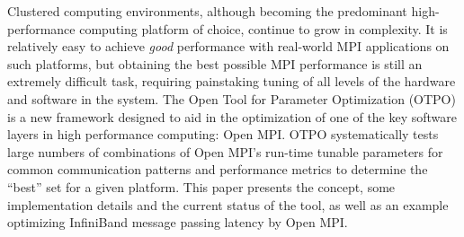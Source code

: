 Clustered computing environments, although becoming the predominant
high-performance computing platform of choice, continue to grow in
complexity.  
%
It is relatively easy to achieve {\em good} performance with
real-world MPI applications on such platforms, but obtaining the best
possible MPI performance is still an extremely difficult task,
requiring painstaking tuning of all levels of the hardware and
software in the system.
%
The Open Tool for Parameter Optimization (OTPO) is a new framework
designed to aid in the optimization of one of the key software layers in
high performance computing: Open MPI.
%
OTPO systematically tests large numbers of combinations of Open MPI's
run-time tunable parameters for common communication patterns and
performance metrics to determine the ``best'' set for a given
platform.
%
This paper presents the concept, some implementation details and the current status of
the tool, as well as an example optimizing InfiniBand message passing
latency by Open MPI.
